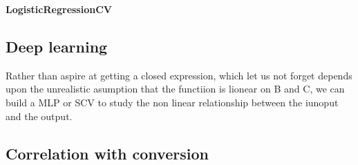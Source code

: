 \documentclass[11pt]{article}
\begin{document}
\textbf{LogisticRegressionCV}


\subsection*{Deep learning}
Rather than aspire at getting a closed expression, which let us not forget depends upon the unrealistic asumption that the functiion is lionear on B and C, we can build a MLP or SCV to study the non linear relationship between the iunoput and the output.



\subsection*{}


\subsection*{Correlation with conversion}
\end{document}
